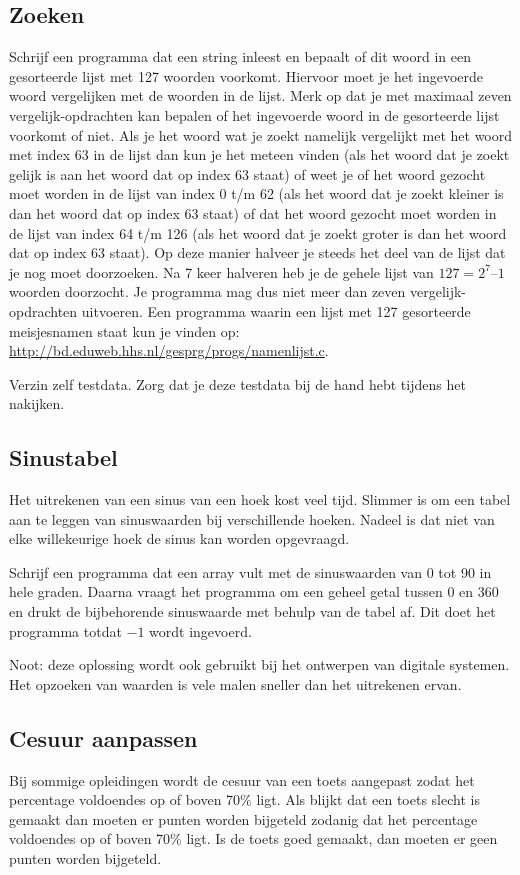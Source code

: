 \documentclass[a4paper,10pt,fleqn,twoside]{article}
\begin{document}
\subsection{Zoeken}
Schrijf een programma dat een string inleest en bepaalt of dit woord in een gesorteerde lijst met 127 woorden voorkomt. Hiervoor moet je het ingevoerde woord vergelijken met de woorden in de lijst. Merk op dat je met maximaal zeven vergelijk-opdrachten kan bepalen of het ingevoerde woord in de gesorteerde lijst voorkomt of niet. Als je het woord wat je zoekt namelijk vergelijkt met het woord met index 63 in de lijst dan kun je het meteen vinden (als het woord dat je zoekt gelijk is aan het woord dat op index 63 staat) of weet je of het woord gezocht moet worden in de lijst van index 0 t/m 62 (als het woord dat je zoekt kleiner is dan het woord dat op index 63 staat) of dat het woord gezocht moet worden in de lijst van index 64 t/m 126 (als het woord dat je zoekt groter is dan het woord dat op index 63 staat). Op deze manier halveer je steeds het deel van de lijst dat je nog moet doorzoeken. Na 7 keer halveren heb je de gehele lijst van $127 = 2^7 – 1$ woorden doorzocht. Je programma mag dus niet meer dan zeven vergelijk-opdrachten uitvoeren. Een programma waarin een lijst met 127 gesorteerde meisjesnamen staat kun je vinden op: \url{http://bd.eduweb.hhs.nl/gesprg/progs/namenlijst.c}. 

Verzin zelf testdata. Zorg dat je deze testdata bij de hand hebt tijdens het nakijken.

\subsection{Sinustabel}
Het uitrekenen van een sinus van een hoek kost veel tijd. Slimmer is om een tabel aan te leggen van sinuswaarden bij verschillende hoeken. Nadeel is dat niet van elke willekeurige hoek de sinus kan worden opgevraagd.

Schrijf een programma dat een array vult met de sinuswaarden van 0 tot 90 in hele graden. Daarna vraagt het programma om een geheel getal tussen 0 en 360 en drukt de bijbehorende sinuswaarde met behulp van de tabel af. Dit doet het programma totdat $-1$ wordt ingevoerd.

Noot: deze oplossing wordt ook gebruikt bij het ontwerpen van digitale systemen. Het opzoeken van waarden is vele malen sneller dan het uitrekenen ervan.


\subsection{Cesuur aanpassen}
Bij sommige opleidingen wordt de cesuur van een toets aangepast zodat het percentage voldoendes op of boven 70\% ligt. Als blijkt dat een toets slecht is gemaakt dan moeten er punten worden bijgeteld zodanig dat het percentage voldoendes op of boven 70\% ligt. Is de toets goed gemaakt, dan moeten er geen punten worden bijgeteld.
\end{document}
